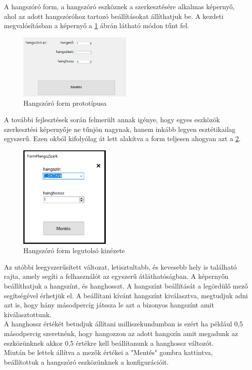 \documentclass[tocnopagenum]{thesis-ekf}
\theoremstyle{definition}
\theoremstyle{remark}
\begin{document}
	

	A hangszóró form, a hangszóró eszköznek a szerkesztésére alkalmas képernyő, ahol az adott hangszóróhoz tartozó beállításokat állíthatjuk be. A kezdeti megvalósításban a képernyő a \ref{fig:hangszformProb} ábrán látható módon tűnt fel.
	 \begin{figure}[H]	
		\centering
		\includegraphics[page=1,width=0.5\textwidth]{hangsz_form}
		\caption[Hangszóró form prototípusa]{Hangszóró form prototípusa}
		\label{fig:hangszformProb}
	\end{figure}
	A további fejlesztések során felmerült annak igénye, hogy egyes eszközök szerkesztési képernyője ne tűnjön nagynak, hanem inkább legyen esztétikailag egyszerű. Ezen okból kifolyólag át lett alakítva a form teljesen ahogyan azt a \ref{fig:hangszFormFo}.
	\begin{figure}[H]	
		\centering
		\includegraphics[page=1,width=0.4\textwidth]{hangsz_szerk}
		\caption[Hangszóró form legutolsó kinézete]{Hangszóró form legutolsó kinézete}
		\label{fig:hangszFormFo}
	\end{figure}
	Az utóbbi leegyszerűsített változat, letisztultabb, és kevesebb hely is található rajta, amely segíti a felhasználót az egyszerű átláthatóságban. 
	A képernyőn beállíthatjuk a hangszínt, és hanghosszt.
	A hangszínt beállítását a legördülő mező segítségével érhetjük el. A beállítani kívánt hangszínt kiválasztva, megtudjuk adni azt is, hogy hány másodpercig játssza le azt a bizonyos hangszínt amit kiválasztottunk.
	\\
	A hanghossz értékét betudjuk állítani milliszekundumban is ezért ha például 0,5 másodpercig szeretnénk, hogy hangozzon az adott hangszín amit megadunk az eszközünknek akkor 0,5 értékre kell beállítanunk a hanghossz változót.
	\\
	Miután be lettek állítva a mezők értékei a "Mentés" gombra kattintva, beállítottuk a hangszóró eszközünknek a konfigurációit.
	\newpage
\end{document}
